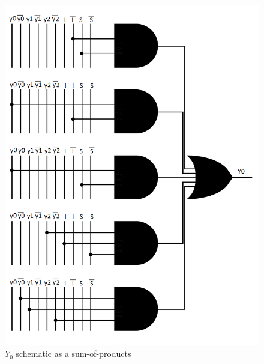 \documentclass[../../e3_tp3_main.tex]{subfiles}
\begin{document}
\begin{figure}[H]
	\centering
	\includegraphics{figures/moore_Y0_schem.PNG}
	\caption{$Y_0$ schematic as a sum-of-products}
	\label{fig:ej1_moore_Y0_schem}
\end{figure}
\end{document}
